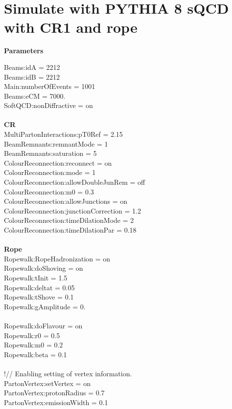 
\section{Simulate with PYTHIA 8 sQCD with CR1 and rope}%
\label{sec:Parameter}


\textbf{Parameters}

Beams:idA = 2212
\\Beams:idB = 2212
\\Main:numberOfEvents = 1001
\\Beams:eCM = 7000.
\\SoftQCD:nonDiffractive = on
\\
\\\textbf{CR}
\\MultiPartonInteractions:pT0Ref = 2.15
\\BeamRemnants:remnantMode = 1
\\BeamRemnants:saturation = 5
\\ColourReconnection:reconnect = on
\\ColourReconnection:mode = 1
\\ColourReconnection:allowDoubleJunRem = off
\\ColourReconnection:m0 = 0.3
\\ColourReconnection:allowJunctions = on
\\ColourReconnection:junctionCorrection = 1.2
\\ColourReconnection:timeDilationMode = 2
\\ColourReconnection:timeDilationPar = 0.18
\\
\\\textbf{Rope}
\\Ropewalk:RopeHadronization = on
\\Ropewalk:doShoving = on
\\Ropewalk:tInit = 1.5 %
\\Ropewalk:deltat = 0.05
\\Ropewalk:tShove = 0.1
\\Ropewalk:gAmplitude = 0. %
\\
\\Ropewalk:doFlavour = on
\\Ropewalk:r0 = 0.5
\\Ropewalk:m0 = 0.2
\\Ropewalk:beta = 0.1
\\
\\!// Enabling setting of vertex information.
\\PartonVertex:setVertex = on
\\PartonVertex:protonRadius = 0.7
\\PartonVertex:emissionWidth = 0.1


